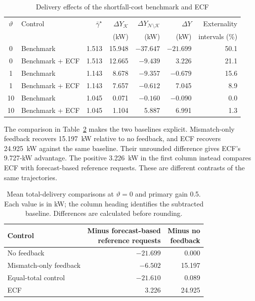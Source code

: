 \documentclass[11pt]{article}
\begin{document}
\begin{table}[!t]
\caption{Delivery effects of the shortfall-cost benchmark and ECF}
\label{tab:supp_settlement_feedback_stage}
\centering
\scriptsize
\setlength{\tabcolsep}{4.0pt}
\begin{tabular}{@{}clrrrrr@{}}
\hline
$\vartheta$ & Control & $\bar\gamma^\star$ &
$\Delta Y_{\mathcal K}$ &
$\Delta Y_{\mathcal N\setminus\mathcal K}$ & $\Delta Y$ & Externality \\
 & & & (kW) & (kW) & (kW) & intervals (\%) \\
\hline
0  & Benchmark & 1.513 & 15.948 & $-37.647$ & $-21.699$ & 50.1 \\
0  & Benchmark + ECF & 1.513 & 12.665 & $-9.439$ & 3.226 & 21.1 \\
1  & Benchmark & 1.143 & 8.678 & $-9.357$ & $-0.679$ & 15.6 \\
1  & Benchmark + ECF & 1.143 & 7.657 & $-0.612$ & 7.045 & 8.9 \\
10 & Benchmark & 1.045 & 0.071 & $-0.160$ & $-0.090$ & 0.0 \\
10 & Benchmark + ECF & 1.045 & 1.104 & 5.887 & 6.991 & 1.3 \\
\hline
\end{tabular}
\end{table}

The comparison in Table~\ref{tab:supp_control_common_baselines} makes the two
baselines explicit. Mismatch-only feedback recovers 15.197~kW relative to no
feedback, and ECF recovers 24.925~kW against the same baseline. Their unrounded
difference gives ECF's 9.727-kW advantage. The positive 3.226~kW in the first
column instead compares ECF with forecast-based reference requests. These are
different contrasts of the same trajectories.

\begin{table}[!ht]
\centering
\caption{Mean total-delivery comparisons at $\vartheta=0$ and primary gain 0.5.
Each value is in kW; the column heading identifies the subtracted baseline.
Differences are calculated before rounding.}
\label{tab:supp_control_common_baselines}
\small
\begin{tabular}{@{}lrr@{}}
\toprule
Control & \shortstack{Minus forecast-based\\reference requests} & \shortstack{Minus no\\feedback} \\
\midrule
No feedback & $-21.699$ & 0.000 \\
Mismatch-only feedback & $-6.502$ & 15.197 \\
Equal-total control & $-21.610$ & 0.089 \\
ECF & 3.226 & 24.925 \\
\bottomrule
\end{tabular}
\end{table}
\end{document}
